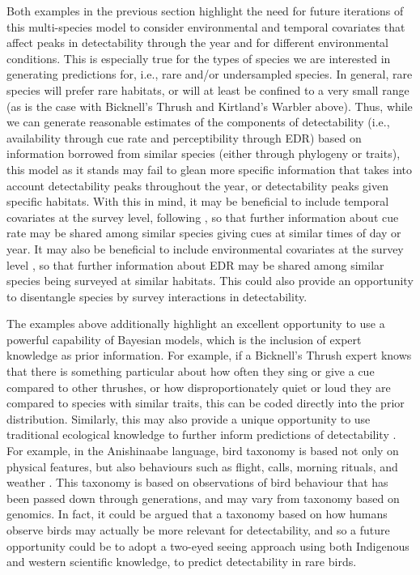 \documentclass[12pt]{article}
\begin{document}
Both examples in the previous section highlight the need for future iterations of this multi-species model to consider environmental and temporal covariates that affect peaks in detectability through the year and for different environmental conditions. 
This is especially true for the types of species we are interested in generating predictions for, i.e., rare and/or undersampled species.
In general, rare species will prefer rare habitats, or will at least be confined to a very small range (as is the case with Bicknell’s Thrush and Kirtland’s Warbler above). 
Thus, while we can generate reasonable estimates of the components of detectability (i.e., availability through cue rate and perceptibility through EDR) based on information borrowed from similar species (either through phylogeny or traits), this model as it stands may fail to glean more specific information that takes into account detectability peaks throughout the year, or detectability peaks given specific habitats. 
With this in mind, it may be beneficial to include temporal covariates at the survey level, following \citet{solymos_calibrating_2013, solymos_evaluating_2018, edwards_point_2023}, so that further information about cue rate may be shared among similar species giving cues at similar times of day or year.
It may also be beneficial to include environmental covariates at the survey level \citep{solymos_calibrating_2013, edwards_point_2023}, so that further information about EDR may be shared among similar species being surveyed at similar habitats.
This could also provide an opportunity to disentangle species by survey interactions in detectability.

\par The examples above additionally highlight an excellent opportunity to use a powerful capability of Bayesian models, which is the inclusion of expert knowledge as prior information. 
For example, if a Bicknell’s Thrush expert knows that there is something particular about how often they sing or give a cue compared to other thrushes, or how disproportionately quiet or loud they are compared to species with similar traits, this can be coded directly into the prior distribution. 
Similarly, this may also provide a unique opportunity to use traditional ecological knowledge to further inform predictions of detectability \citep{wardfear_sharper_2019}.
For example, in the Anishinaabe language, bird taxonomy is based not only on physical features, but also behaviours such as flight, calls, morning rituals, and weather \citep{pitawanakwat_evening_2022}.
This taxonomy is based on observations of bird behaviour that has been passed down through generations, and may vary from taxonomy based on genomics.
In fact, it could be argued that a taxonomy based on how humans observe birds may actually be more relevant for detectability, and so a future opportunity could be to adopt a two-eyed seeing approach \cite{reid_twoeyed_2021} using both Indigenous and western scientific knowledge, to predict detectability in rare birds.
\end{document}

